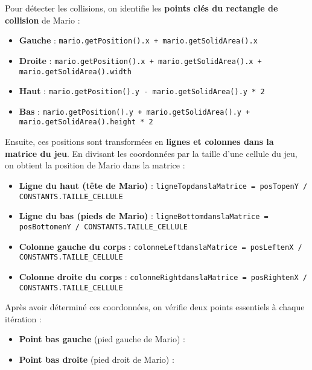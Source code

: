 \documentclass{report}
\begin{document}
Pour détecter les collisions, on identifie les \textbf{points clés du rectangle de collision} de Mario :

\begin{itemize}
    \item \textbf{Gauche} : \texttt{mario.getPosition().x + mario.getSolidArea().x}
    \item \textbf{Droite} : \texttt{mario.getPosition().x + mario.getSolidArea().x + mario.getSolidArea().width}
    \item \textbf{Haut} : \texttt{mario.getPosition().y - mario.getSolidArea().y * 2}
    \item \textbf{Bas} : \texttt{mario.getPosition().y + mario.getSolidArea().y + mario.getSolidArea().height * 2}
\end{itemize}

Ensuite, ces positions sont transformées en \textbf{lignes et colonnes dans la matrice du jeu}. En divisant les coordonnées par la taille d'une cellule du jeu, on obtient la position de Mario dans la matrice :

\begin{itemize}
    \item \textbf{Ligne du haut (tête de Mario)} : \texttt{ligneTopdanslaMatrice = posTopenY / CONSTANTS.TAILLE\_CELLULE}
    \item \textbf{Ligne du bas (pieds de Mario)} : \texttt{ligneBottomdanslaMatrice = posBottomenY / CONSTANTS.TAILLE\_CELLULE}
    \item \textbf{Colonne gauche du corps} : \texttt{colonneLeftdanslaMatrice = posLeftenX / CONSTANTS.TAILLE\_CELLULE}
    \item \textbf{Colonne droite du corps} : \texttt{colonneRightdanslaMatrice = posRightenX / CONSTANTS.TAILLE\_CELLULE}
\end{itemize}

Après avoir déterminé ces coordonnées, on vérifie deux points essentiels à chaque itération :

\begin{itemize}
    \item \textbf{Point bas gauche} (pied gauche de Mario) : 
    \item \textbf{Point bas droite} (pied droit de Mario) : 
\end{itemize}
\end{document}

